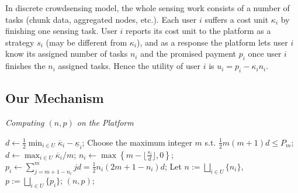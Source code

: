\documentclass[conference]{IEEEtran}
\theoremstyle{definition}
\begin{document}

In discrete crowdsensing model, the whole sensing work consists of a number of tasks (chunk data, aggregated nodes, etc.). Each user $i$ suffers a cost unit $\kappa_i$ by finishing one sensing task. User $i$ reports its cost unit to the platform as a strategy $s_i$ (may be different from $\kappa_i$), and as a response the platform lets user $i$ know its assigned number of tasks $n_i$ and the promised payment $p_i$ once user $i$ finishes the $n_i$ assigned tasks. Hence the utility of user $i$ is $u_i = p_i - \kappa_i n_i$. %



\subsection{Our Mechanism}
\begin{algorithm}[!t]
\begin{small}
\caption{\emph{Computing $(n, p)$ on the Platform}}
\label{alg:np}
\renewcommand{\algorithmicrequire}{\textbf{Input:}}
\renewcommand{\algorithmicensure}{\textbf{Output:}}
\begin{algorithmic}[1]
\State $d \gets \frac{1}{2}\min_{i\in U} \overline{\kappa}_i - \underline{\kappa}_i$;
\State Choose the maximum integer $m$ s.t. $\frac{1}{2}m(m+1)d \leq P_m$;
	\State $d \gets \max_{i\in U} \overline{\kappa}_i/m$;
\EndIf
{}
	\State $n_i \gets \max \left\{ m-\lfloor \frac{s_i}{d}\rfloor, 0 \right\}$;
	\State $p_i \gets \sum_{j=m+1-n_i}^m jd = \frac{1}{2}n_i(2m+1-n_i)d$;
\EndFor
\State Let $n := \bigsqcup_{i\in U} \{n_i\}$, $p := \bigsqcup_{i\in U} \{p_i\}$;
 $(n, p)$;
\end{algorithmic}
\end{small}
\end{algorithm}
\addtocounter{footnote}{1}
\end{document}
